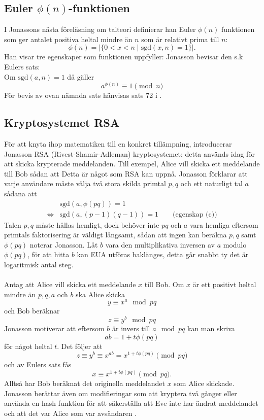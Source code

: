\subsection*{Euler $\phi(n)$-funktionen}
I Jonassons nästa föreläsning om talteori definierar han Euler $\phi(n)$ funktionen som ger antalet positiva heltal mindre än $n$ som är relativt prima till $n$:
$$\phi(n)=\left|\{0 < x < n \mid \text{sgd}{(x,n)=1}\}\right|.$$
Han visar tre egenskaper som funktionen uppfyller:
Jonasson bevisar den s.k Eulers sats:\\
Om $\text{sgd}{(a,n)}=1$ då gäller
$$a^{\phi{(n)}}\equiv 1 \pmod{n}$$
För bevis av ovan nämnda sats hänvisas sats 72 i \cite{hardy}.

\subsection*{Kryptosystemet RSA}
För att knyta ihop matematiken till en konkret tillämpning, introducerar Jonasson RSA (Rivest-Shamir-Adleman) kryptosystemet; detta används idag för att skicka krypterade meddelanden. Till exempel, Alice vill skicka ett meddelande till Bob sådan att
Detta är något som RSA kan uppnå. Jonasson förklarar att varje användare måste välja två stora skilda primtal $p,q$ och ett naturligt tal $a$ sådana att
\begin{align*}
	&\text{sgd}{(a,\phi{(pq)})}=1\\
	\iff &\text{sgd}{(a,(p-1)(q-1))}=1\quad\quad\text{(egenskap (c))}
\end{align*}
Talen $p,q$ måste hållas hemligt, dock behöver inte $pq$ och $a$ vara hemliga eftersom primtals faktorisering är väldigt långsamt, sådan att ingen kan beräkna $p,q$ samt $\phi{(pq)}$ noterar Jonasson. Låt $b$ vara den multiplikativa inversen av $a$ modulo $\phi{(pq)}$, för att hitta $b$ kan EUA utföras baklänges, detta går snabbt ty det är logaritmisk antal steg.\\\\
Antag att Alice vill skicka ett meddelande $x$ till Bob. Om $x$ är ett positivt heltal mindre än $p,q,a$ och $b$ ska Alice skicka
$$y\equiv x^a \mod pq$$
och Bob beräknar
$$z\equiv y^b \mod{pq}$$
Jonasson motiverar att eftersom $b$ är invers till $a \mod{pq}$ kan man skriva
$$ab=1+t\phi{(pq)}$$
för något heltal $t$. Det följer att
$$z\equiv y^b \equiv x^{ab}= x^{1+t\phi{(pq)}} \pmod{pq}$$
och av Eulers sats fås
$$x\equiv x^{1+t\phi{(pq)}} \pmod{pq}.$$
Alltså har Bob beräknat det originella meddelandet $x$ som Alice skickade. Jonasson berättar även om modifieringar som att kryptera två gånger eller använda en hash funktion för att säkerställa att Eve inte har ändrat meddelandet och att det var Alice som var avsändaren \cite{talteori2}.
